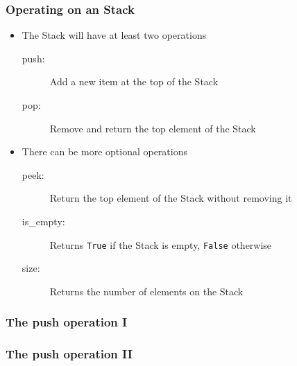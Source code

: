 \documentclass[11pt]{beamer}
\begin{document}
\begin{frame}\frametitle{Operating on an Stack}
\begin{itemize}
\item The Stack will have at least two operations
    \begin{description}
    \item[push:] Add a new item at the top of the Stack
    \item[pop:] Remove and return the top element of the Stack
    \end{description}
\item There can be more optional operations
    \begin{description}
    \item[peek:] Return the top element of the Stack without removing it
    \item[is\_empty:] Returns \lstinline|True| if the Stack is empty, \lstinline|False| otherwise
    \item[size:] Returns the number of elements on the Stack
    \end{description}
\end{itemize}
\end{frame}

\begin{frame}\frametitle{The push operation I}
\begin{center}
\end{center}
\end{frame}

\begin{frame}\frametitle{The push operation II}
\begin{center}
\end{center}
\end{frame}
\end{document}
